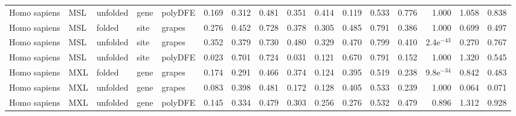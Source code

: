\begin{longtable}{lllllrrrrrrrrrrr}
        Homo sapiens &                       MSL &  unfolded &  gene &  polyDFE &                              0.169 &                               0.312 &                 0.481 &                 0.351 &                              0.414 &                               0.119 &                 0.533 &                 0.776 &         1.000 &  1.058 &  0.838 \\
        Homo sapiens &                       MSL &    folded &  site &   grapes &                              0.276 &                               0.452 &                 0.728 &                 0.378 &                              0.305 &                               0.485 &                 0.791 &                 0.386 &         1.000 &  0.699 &  0.497 \\
        Homo sapiens &                       MSL &  unfolded &  site &   grapes &                              0.352 &                               0.379 &                 0.730 &                 0.480 &                              0.329 &                               0.470 &                 0.799 &                 0.410 &  2.4e$^{-43}$ &  0.270 &  0.767 \\
        Homo sapiens &                       MSL &  unfolded &  site &  polyDFE &                              0.023 &                               0.701 &                 0.724 &                 0.031 &                              0.121 &                               0.670 &                 0.791 &                 0.152 &         1.000 &  1.320 &  0.545 \\
        Homo sapiens &                       MXL &    folded &  gene &   grapes &                              0.174 &                               0.291 &                 0.466 &                 0.374 &                              0.124 &                               0.395 &                 0.519 &                 0.238 &  9.8e$^{-34}$ &  0.842 &  0.483 \\
        Homo sapiens &                       MXL &  unfolded &  gene &   grapes &                              0.083 &                               0.398 &                 0.481 &                 0.172 &                              0.128 &                               0.405 &                 0.533 &                 0.239 &         1.000 &  0.064 &  0.071 \\
        Homo sapiens &                       MXL &  unfolded &  gene &  polyDFE &                              0.145 &                               0.334 &                 0.479 &                 0.303 &                              0.256 &                               0.276 &                 0.532 &                 0.479 &         0.896 &  1.312 &  0.928 \\

\end{longtable}
